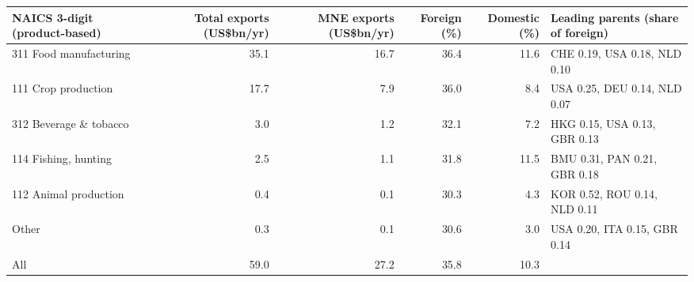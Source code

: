 \begin{tabular}{@{}l r r r r l@{}}
\toprule
NAICS 3-digit (product-based) & Total exports (US\$bn/yr) & MNE exports (US\$bn/yr) & Foreign (\%) & Domestic (\%) & Leading parents (share of foreign) \\
\midrule
311 Food manufacturing & 35.1 & 16.7 & 36.4 & 11.6 & CHE 0.19, USA 0.18, NLD 0.10 \\
111 Crop production & 17.7 & 7.9 & 36.0 & 8.4 & USA 0.25, DEU 0.14, NLD 0.07 \\
312 Beverage \& tobacco & 3.0 & 1.2 & 32.1 & 7.2 & HKG 0.15, USA 0.13, GBR 0.13 \\
114 Fishing, hunting & 2.5 & 1.1 & 31.8 & 11.5 & BMU 0.31, PAN 0.21, GBR 0.18 \\
112 Animal production & 0.4 & 0.1 & 30.3 & 4.3 & KOR 0.52, ROU 0.14, NLD 0.11 \\
Other & 0.3 & 0.1 & 30.6 & 3.0 & USA 0.20, ITA 0.15, GBR 0.14 \\
\midrule
All & 59.0 & 27.2 & 35.8 & 10.3 & \\
\bottomrule
\end{tabular}
